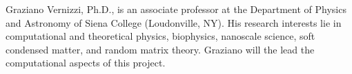 \documentclass[11pt, preprint]{aastex}
\begin{document}
{%

Graziano Vernizzi, Ph.D., is an associate professor at the Department of
Physics and Astronomy of Siena College (Loudonville, NY).
His research interests lie in computational and theoretical
physics, biophysics, nanoscale science, soft condensed matter, and
random matrix theory. 
Graziano will the lead the computational
aspects of this project.






}
\end{document}
